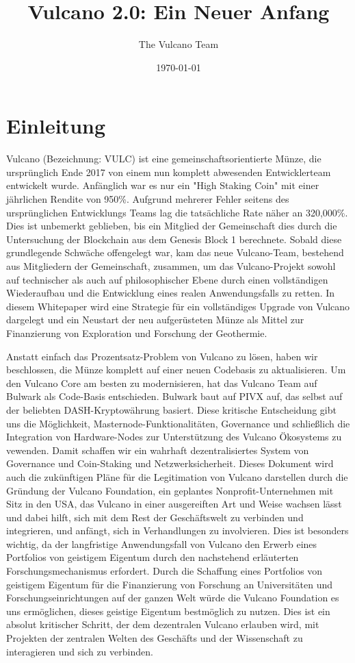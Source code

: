 \documentclass[A4paper, 12pt]{article}
\begin{document}
\RaggedRight
\title{Vulcano 2.0: Ein Neuer Anfang}
\author{The Vulcano Team}
\date{\today}

\newpage
\tableofcontents
\newpage
\section{Einleitung}

Vulcano (Bezeichnung: VULC) ist eine gemeinschaftsorientierte Münze, die ursprünglich Ende 2017 von einem nun komplett abwesenden Entwicklerteam entwickelt wurde. Anfänglich war es nur ein "High Staking Coin" mit einer jährlichen Rendite von 950\%. Aufgrund mehrerer Fehler seitens des ursprünglichen Entwicklungs Teams lag die tatsächliche Rate näher an 320,000\%. Dies ist unbemerkt geblieben, bis ein Mitglied der Gemeinschaft dies durch die Untersuchung der Blockchain aus dem Genesis Block 1 berechnete. Sobald diese grundlegende Schwäche offengelegt war, kam das neue Vulcano-Team, bestehend aus Mitgliedern der Gemeinschaft, zusammen, um das Vulcano-Projekt sowohl auf technischer als auch auf philosophischer Ebene durch einen vollständigen Wiederaufbau und die Entwicklung eines realen Anwendungsfalls zu retten. In diesem Whitepaper wird eine Strategie für ein vollständiges Upgrade von Vulcano dargelegt und ein Neustart der neu aufgerüsteten Münze als Mittel zur Finanzierung von Exploration und Forschung der Geothermie. 

Anstatt einfach das Prozentsatz-Problem von Vulcano zu lösen, haben wir beschlossen, die Münze komplett auf einer neuen Codebasis zu aktualisieren. Um den Vulcano Core am besten zu modernisieren, hat das Vulcano Team auf Bulwark als Code-Basis entschieden. Bulwark baut auf PIVX auf, das selbst auf der beliebten DASH-Kryptowährung basiert. Diese kritische Entscheidung gibt uns die Möglichkeit, Masternode-Funktionalitäten, Governance und schließlich die Integration von Hardware-Nodes zur Unterstützung des Vulcano Ökosystems zu vewenden. Damit schaffen wir ein wahrhaft dezentralisiertes System von Governance und Coin-Staking und Netzwerksicherheit. Dieses Dokument wird auch die zukünftigen Pläne für die Legitimation von Vulcano darstellen durch die Gründung der Vulcano Foundation, ein geplantes  Nonprofit-Unternehmen mit Sitz in den USA, das Vulcano in einer ausgereiften Art und Weise wachsen lässt und dabei hilft, sich mit dem Rest der Geschäftswelt zu verbinden und integrieren, und anfängt, sich in Verhandlungen zu involvieren. Dies ist besonders wichtig, da der langfristige Anwendungsfall von Vulcano den Erwerb eines Portfolios von geistigem Eigentum durch den nachstehend erläuterten Forschungsmechanismus erfordert. Durch die Schaffung eines Portfolios von geistigem Eigentum für die Finanzierung von Forschung an Universitäten und Forschungseinrichtungen auf der ganzen Welt würde die Vulcano Foundation es uns ermöglichen, dieses geistige Eigentum bestmöglich zu nutzen. 
Dies ist ein absolut kritischer Schritt, der dem dezentralen Vulcano erlauben wird, mit Projekten der zentralen Welten des Geschäfts und der Wissenschaft zu interagieren und sich zu verbinden. 
\end{document}

